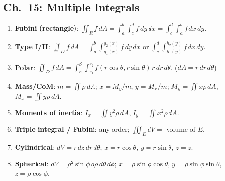 \documentclass[12pt]{article}
\theoremstyle{compact}
\begin{document}
\subsection{Ch.\ 15: Multiple Integrals}
\begin{enumerate}[label=\textbf{15.\arabic*.},leftmargin=*,itemsep=1pt]
  \item \textbf{Fubini (rectangle)}: $\iint_R f\,dA=\int_a^b\int_c^d f\,dy\,dx=\int_c^d\int_a^b f\,dx\,dy$.
  \item \textbf{Type I/II}: $\iint_D f\,dA=\int_a^b\int_{g_1(x)}^{g_2(x)}f\,dy\,dx$ or $\int_c^d\int_{h_1(y)}^{h_2(y)}f\,dx\,dy$.
  \item \textbf{Polar}: $\iint_D f\,dA=\int_\alpha^\beta\int_{r_1}^{r_2}f(r\cos\theta,r\sin\theta)\,r\,dr\,d\theta$. \quad($dA=r\,dr\,d\theta$)
  \item \textbf{Mass/CoM}: $m=\iint\rho\,dA$; $\bar x=M_y/m$, $\bar y=M_x/m$; $M_y=\iint x\rho\,dA$, $M_x=\iint y\rho\,dA$.
  \item \textbf{Moments of inertia}: $I_x=\iint y^2\rho\,dA$, $I_y=\iint x^2\rho\,dA$.
  \item \textbf{Triple integral / Fubini}: any order; $\iiint_E dV=$ volume of $E$.
  \item \textbf{Cylindrical}: $dV=r\,dz\,dr\,d\theta$; $x=r\cos\theta$, $y=r\sin\theta$, $z=z$.
  \item \textbf{Spherical}: $dV=\rho^2\sin\phi\,d\rho\,d\theta\,d\phi$; $x=\rho\sin\phi\cos\theta$, $y=\rho\sin\phi\sin\theta$, $z=\rho\cos\phi$.
\end{enumerate}
\end{document}
